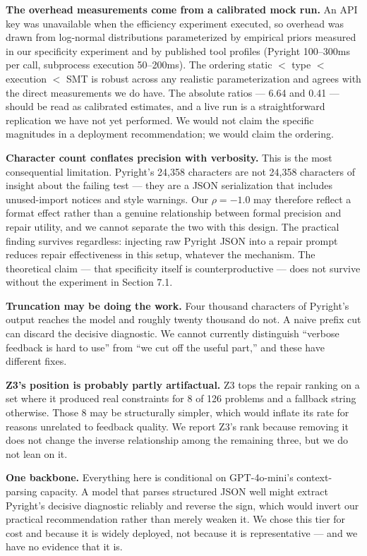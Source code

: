 \textbf{The overhead measurements come from a calibrated mock run.} An API key was unavailable when the efficiency experiment executed, so overhead was drawn from log-normal distributions parameterized by empirical priors measured in our specificity experiment and by published tool profiles (Pyright 100--300ms per call, subprocess execution 50--200ms). The ordering static $<$ type $<$ execution $<$ SMT is robust across any realistic parameterization and agrees with the direct measurements we do have. The absolute ratios --- 6.64 and 0.41 --- should be read as calibrated estimates, and a live run is a straightforward replication we have not yet performed. We would not claim the specific magnitudes in a deployment recommendation; we would claim the ordering.

\textbf{Character count conflates precision with verbosity.} This is the most consequential limitation. Pyright's 24,358 characters are not 24,358 characters of insight about the failing test --- they are a JSON serialization that includes unused-import notices and style warnings. Our $\rho = -1.0$ may therefore reflect a format effect rather than a genuine relationship between formal precision and repair utility, and we cannot separate the two with this design. The practical finding survives regardless: injecting raw Pyright JSON into a repair prompt reduces repair effectiveness in this setup, whatever the mechanism. The theoretical claim --- that specificity itself is counterproductive --- does not survive without the experiment in Section 7.1.

\textbf{Truncation may be doing the work.} Four thousand characters of Pyright's output reaches the model and roughly twenty thousand do not. A naive prefix cut can discard the decisive diagnostic. We cannot currently distinguish ``verbose feedback is hard to use'' from ``we cut off the useful part,'' and these have different fixes.

\textbf{Z3's position is probably partly artifactual.} Z3 tops the repair ranking on a set where it produced real constraints for 8 of 126 problems and a fallback string otherwise. Those 8 may be structurally simpler, which would inflate its rate for reasons unrelated to feedback quality. We report Z3's rank because removing it does not change the inverse relationship among the remaining three, but we do not lean on it.

\textbf{One backbone.} Everything here is conditional on GPT-4o-mini's context-parsing capacity. A model that parses structured JSON well might extract Pyright's decisive diagnostic reliably and reverse the sign, which would invert our practical recommendation rather than merely weaken it. We chose this tier for cost and because it is widely deployed, not because it is representative --- and we have no evidence that it is.

